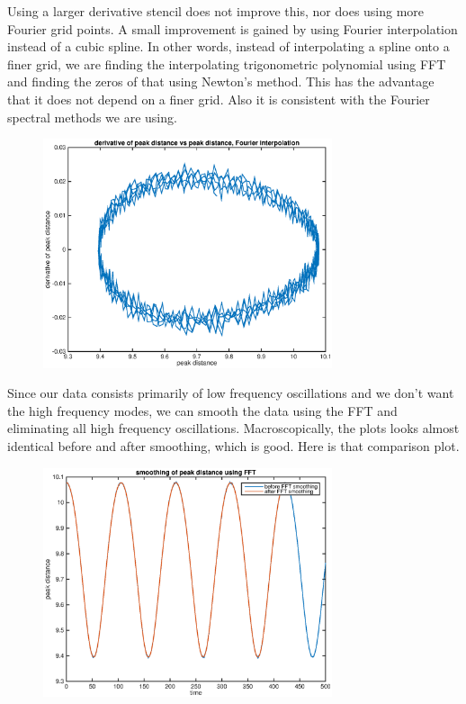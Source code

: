 \documentclass[12pt]{article}
\begin{document}
Using a larger derivative stencil does not improve this, nor does using more Fourier grid points. A small improvement is gained by using Fourier interpolation instead of a cubic spline. In other words, instead of interpolating a spline onto a finer grid, we are finding the interpolating trigonometric polynomial using FFT and finding the zeros of that using Newton's method. This has the advantage that it does not depend on a finer grid. Also it is consistent with the Fourier spectral methods we are using.

\begin{figure}[H]
	\includegraphics[width=8.5cm]{peakderivdistF}
\end{figure}

Since our data consists primarily of low frequency oscillations and we don't want the high frequency modes, we can smooth the data using the FFT and eliminating all high frequency oscillations. Macroscopically, the plots looks almost identical before and after smoothing, which is good. Here is that comparison plot.

\begin{figure}[H]
	\includegraphics[width=8.5cm]{FFTsmooth}
\end{figure}
\end{document}
